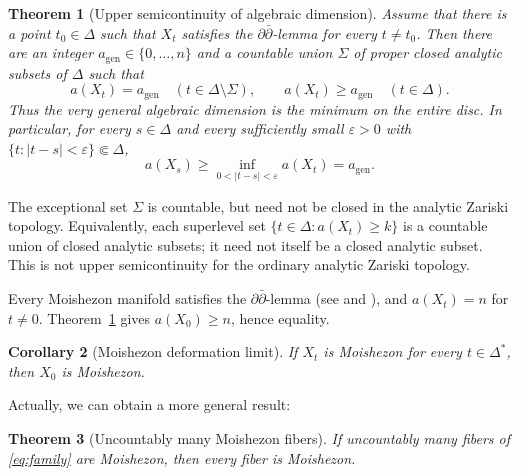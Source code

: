\documentclass[11pt]{amsart}
\numberwithin{equation}{section}
\theoremstyle{plain}
\newtheorem{thm}{Theorem}[section]
\newtheorem{cor}[thm]{Corollary}
\theoremstyle{definition}
\begin{document}
\begin{thm}[Upper semicontinuity of algebraic dimension]\label{thm:main}
Assume that there is a point $t_0\in\Delta$ such that $X_t$ satisfies
the $\partial\bar\partial$-lemma for every $t\ne t_0$.
Then there are an integer $a_{\mathrm{gen}}\in\{0,\ldots,n\}$ and a
countable union $\Sigma$ of proper closed analytic subsets of $\Delta$
such that
\[
 a(X_t)=a_{\mathrm{gen}}\quad(t\in\Delta\setminus\Sigma),
 \qquad a(X_t)\ge a_{\mathrm{gen}}\quad(t\in\Delta).
\]
Thus the very general algebraic dimension is the minimum on the entire
disc.  In particular, for every $s\in\Delta$ and every sufficiently small
$\varepsilon>0$ with $\{t:|t-s|<\varepsilon\}\Subset\Delta$,
\begin{equation}\label{eq:main-inequality}
 a(X_s)\geq
 \inf_{0<|t-s|<\varepsilon}a(X_t)=a_{\mathrm{gen}}.
\end{equation}
\end{thm}

The exceptional set $\Sigma$ is countable, but need not be closed in
the analytic Zariski topology.  Equivalently, each superlevel set
$\{t\in\Delta:a(X_t)\ge k\}$ is a countable union of closed analytic
subsets; it need not itself be a closed analytic subset.  This is not
upper semicontinuity for the ordinary analytic Zariski topology.

  
Every Moishezon manifold satisfies the $\partial\bar\partial$-lemma
(see \cite{Pa66} and \cite[Corollary~5.23]{DGMS75}), and
$a(X_t)=n$ for $t\ne0$.  Theorem~\ref{thm:main} gives
$a(X_0)\ge n$, hence equality.
\begin{cor}[Moishezon deformation limit]\label{cor:moishezon}
If $X_t$ is Moishezon for every $t\in\Delta^*$, then $X_0$ is
Moishezon.
\end{cor}

Actually, we can obtain a more general result: 
\begin{thm}[Uncountably many Moishezon fibers]\label{Moishezon}
If uncountably many fibers of \eqref{eq:family} are Moishezon, then every
fiber is Moishezon.
\end{thm}
\end{document}
